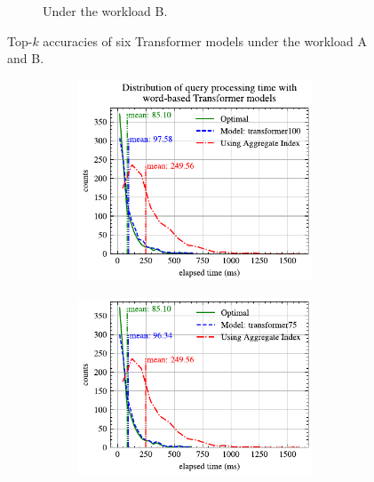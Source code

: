 \documentclass[conference]{IEEEtran}
\begin{document}
\begin{figure}[!th]
\begin{subfigure}{0.45\textwidth}
		\caption{Under the workload B.}
		\label{fig:top_k_transformer_B}
	\end{subfigure}
	\caption{Top-$k$ accuracies of six Transformer models under the workload A and B.}
	\label{fig:top_k_transformer_all}
\end{figure}
\begin{figure}[p]
	\centering
	\begin{subfigure}{0.45\textwidth}
		\begin{subfigure}{\textwidth}
			\centering
			\includegraphics[]{graphics/perf_dist_transformer100_A.pdf}
		\end{subfigure}
		\vfill
		\begin{subfigure}{\textwidth}
			\centering
			\includegraphics[]{graphics/perf_dist_transformer75_A.pdf}

\end{subfigure}
\end{subfigure}
\end{figure}
\end{document}

